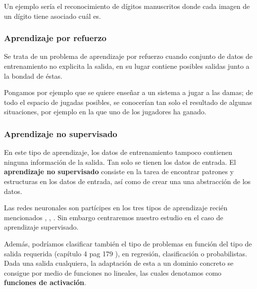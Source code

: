 Un ejemplo sería el reconocimiento de dígitos  manuscritos donde cada imagen de un dígito tiene asociado cuál es. 


\subsubsection{Aprendizaje por refuerzo}  
Se trata de un problema de aprendizaje por refuerzo 
cuando conjunto de datos de entrenamiento no explicita la salida, en su lugar contiene posibles salidas junto a la bondad de éstas. 

Pongamos por ejemplo que se quiere enseñar a un sistema a jugar
a las damas; de todo el espacio de jugadas posibles, se conocerían tan solo el resultado de algunas situaciones, por ejemplo en la que uno de los jugadores ha ganado.  

\subsubsection{Aprendizaje no supervisado}  

En este tipo de aprendizaje, los datos de entrenamiento tampoco contienen ninguna información de la salida.
 Tan solo se tienen los datos de entrada. El \textbf{aprendizaje no supervisado} 
 consiste en la tarea de encontrar patrones y estructuras en los datos de entrada, 
 así como de crear una una abstracción de los datos.  


Las redes neuronales son partícipes en los tres tipos de aprendizaje 
recién mencionados
\cite{8612259}, \cite{DBLP:journals/corr/BakerGNR16}, \cite{10.5555/2955491.2955578}. Sin embargo centraremos nuestro estudio en el caso 
de aprendizaje supervisado. 

Además, podríamos clasificar también el tipo de problemas en función del tipo de salida requerida (capítulo 4 pag 179
\cite{BishopPaterRecognition}), en regresión, clasificación o probabilistas. 
Dada una salida cualquiera, la adaptación de esta a un dominio concreto se consigue por medio de funciones 
no lineales, las cuales denotamos como \textbf{funciones de activación}. 